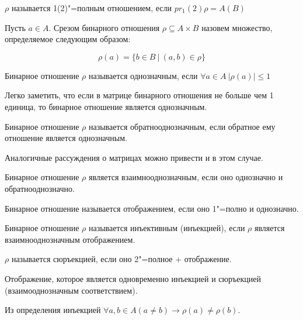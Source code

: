 \begin{definition}
    $\rho$ называется 1(2)"=полным отношением, если $pr_1(2)\rho = A(B)$
\end{definition}

\begin{definition}
    Пусть $a \in A$. Срезом бинарного отношения $\rho \subseteq A \times B$ назовем
    множество, определяемое следующим образом:

    \begin{equation*}
        \rho(a) = \{b \in B ~|~ (a, b) \in \rho\}
    \end{equation*}
\end{definition}

\begin{definition}
    Бинарное отношение $\rho$ называется однозначным, если 
    $\forall a \in A ~| \rho(a)| \leq 1$
\end{definition}

Легко заметить, что если в матрице бинарного отношения не больше чем 1 единица,
то бинарное отношение является однозначным.

\begin{definition}
    Бинарное отношение $\rho$ называется обратнооднозначным, если обратное ему
    отношение является однозначным.
\end{definition}

Аналогичные рассуждения о матрицах можно привести и в этом случае.

\begin{definition}
    Бинарное отношение $\rho$ является взаимнооднозначным, если оно однозначно
    и обратнооднозначно.
\end{definition}

\begin{definition}
    Бинарное отношение называется отображением, если оно 1"=полно и однозначно.
\end{definition}

\begin{definition}
    Бинарное отношение $\rho$ называется инъективным (инъекцией), если $\rho$ является
    взаимнооднозначным отображением.
\end{definition}

$\rho$ называется сюръекцией, если оно 2"=полное + отображение.

Отображение, которое является одновременно инъекцией и 
сюръекцией (взаимооднозначным соответствием).

Из определения инъекцией $\forall a, b \in A (a \neq b) \rightarrow \rho(a) \neq \rho(b)$.

